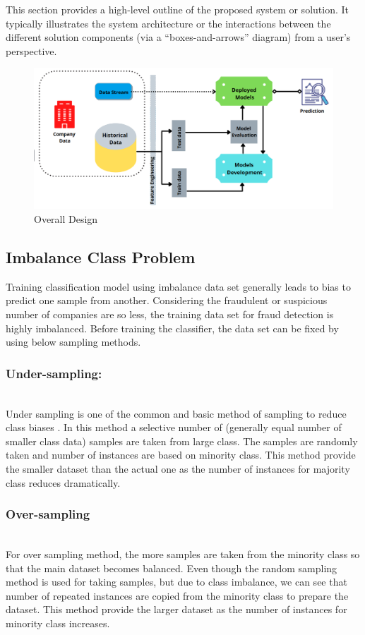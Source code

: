This section provides a high-level outline of the proposed system or solution. It typically illustrates the system architecture or the interactions between the different solution components (via a “boxes-and-arrows” diagram) from a user’s perspective.

\begin{figure}[htp]
    \centering
    \includegraphics[width=\linewidth]{figures/overall_design.PNG}
    \caption{Overall Design}
    \label{fig:design}
\end{figure}

\subsection{Imbalance Class Problem}
Training classification model using imbalance data set generally leads to bias to predict one sample from another. Considering the fraudulent or suspicious number of companies are so less, the training data set for fraud detection is highly imbalanced. Before training the classifier, the data set can be fixed by using below sampling methods.    
\subsubsection{Under-sampling:}\hspace*{\fill} \\
Under sampling is one of the common and basic method of sampling to reduce class biases \cite{10.1145/3055635.3056643}. In this method a selective number of (generally equal number of smaller class data) samples are taken from large class. The samples are randomly taken and number of instances are based on minority class. This method provide the smaller dataset than the actual one as the number of instances for majority class reduces dramatically. 
\subsubsection{Over-sampling}\hspace*{\fill} \\
For over sampling method, the more samples are taken from the minority class so that the main dataset becomes balanced. Even though the random sampling method is used for taking samples, but due to class imbalance, we can see that number of repeated instances are copied from the minority class to prepare the dataset. This method provide the larger dataset as the number of instances for minority class increases. 

